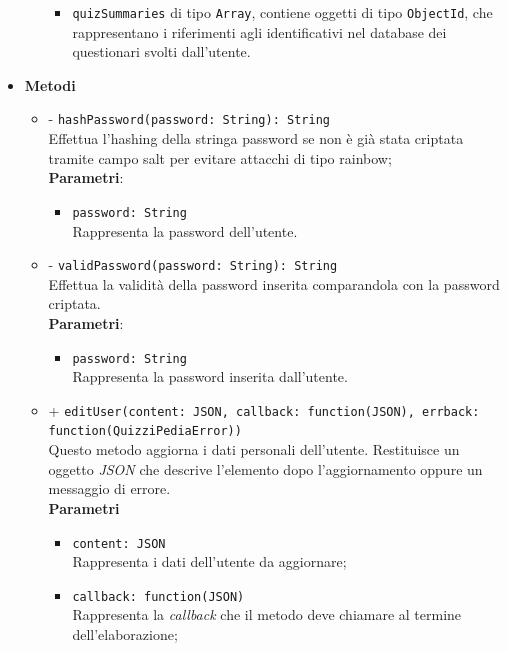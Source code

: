 \begin{itemize}
\begin{itemize}
\begin{itemize}
				\item
					\texttt{quizSummaries} di tipo \texttt{Array}, contiene oggetti di tipo \texttt{ObjectId}, che rappresentano i riferimenti agli identificativi nel database dei questionari svolti dall'utente.		
			\end{itemize}	
		\end{itemize}	
	\item \textbf{Metodi}
		\begin{itemize}
		\item
		- \texttt{hashPassword(password: String): String} \\
		Effettua l'hashing della stringa password se non è già stata criptata tramite campo salt per evitare attacchi di tipo rainbow; \\
		\textbf{Parametri}: 
			\begin{itemize}
			\item
				 \texttt{password: String} \\
				Rappresenta la password dell'utente.
			\end{itemize}
		\item
		- \texttt{validPassword(password: String): String} \\
		Effettua la validità della password inserita comparandola con la password criptata.	\\
		\textbf{Parametri}: 
			\begin{itemize}
			\item
				\texttt{password: String} \\
				Rappresenta la password inserita dall'utente.
			\end{itemize}
		\item
		+ \texttt{editUser(content: JSON, callback: function(JSON), errback:\\ function(QuizziPediaError))} \\
		Questo metodo aggiorna i dati personali dell'utente. Restituisce un oggetto \textit{JSON} che descrive l'elemento dopo l'aggiornamento oppure un messaggio di errore.	\\
		\textbf{Parametri} 
			\begin{itemize}
			\item
				\texttt{content: JSON} \\
				Rappresenta i dati dell'utente da aggiornare;
			\item	
				\texttt{callback: function(JSON)} \\
				Rappresenta la \textit{callback} che il metodo deve chiamare al termine dell'elaborazione;

\end{itemize}
\end{itemize}
\end{itemize}
